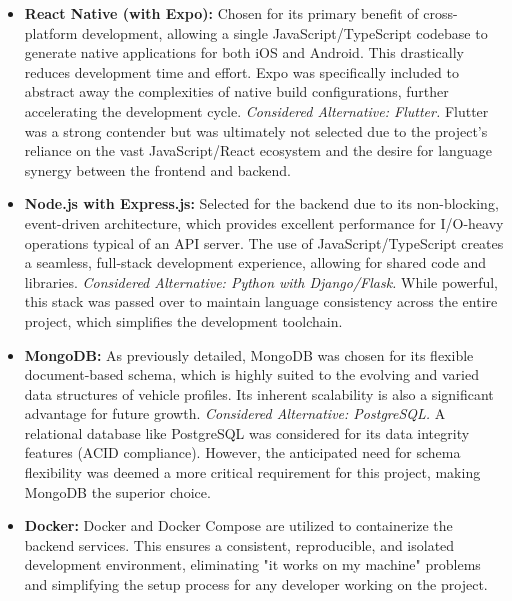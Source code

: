 \begin{itemize}
    \item \textbf{React Native (with Expo):} Chosen for its primary benefit of cross-platform development, allowing a single JavaScript/TypeScript codebase to generate native applications for both iOS and Android. This drastically reduces development time and effort. Expo was specifically included to abstract away the complexities of native build configurations, further accelerating the development cycle.
    \newline\textit{Considered Alternative: Flutter.} Flutter was a strong contender but was ultimately not selected due to the project's reliance on the vast JavaScript/React ecosystem and the desire for language synergy between the frontend and backend.
    
    \textgap
    
    \item \textbf{Node.js with Express.js:} Selected for the backend due to its non-blocking, event-driven architecture, which provides excellent performance for I/O-heavy operations typical of an API server. The use of JavaScript/TypeScript creates a seamless, full-stack development experience, allowing for shared code and libraries.
    \newline\textit{Considered Alternative: Python with Django/Flask.} While powerful, this stack was passed over to maintain language consistency across the entire project, which simplifies the development toolchain.
    
    \textgap
    
    \item \textbf{MongoDB:} As previously detailed, MongoDB was chosen for its flexible document-based schema, which is highly suited to the evolving and varied data structures of vehicle profiles. Its inherent scalability is also a significant advantage for future growth.
    \newline\textit{Considered Alternative: PostgreSQL.} A relational database like PostgreSQL was considered for its data integrity features (ACID compliance). However, the anticipated need for schema flexibility was deemed a more critical requirement for this project, making MongoDB the superior choice.
    
    \textgap

    \item \textbf{Docker:} Docker and Docker Compose are utilized to containerize the backend services. This ensures a consistent, reproducible, and isolated development environment, eliminating "it works on my machine" problems and simplifying the setup process for any developer working on the project.
\end{itemize}

